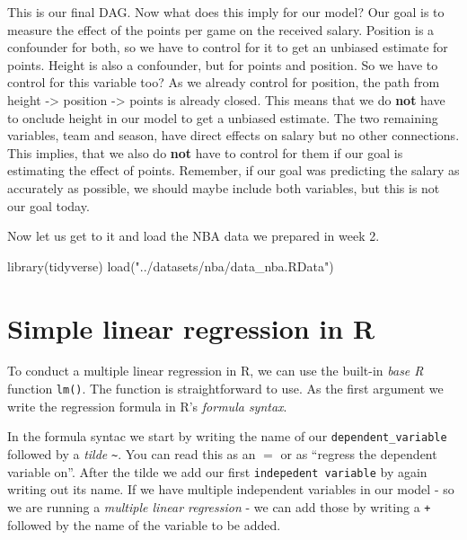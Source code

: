 \documentclass[
]{book}
\newenvironment{Shaded}{\begin{snugshade}}{\end{snugshade}}
\newcommand{\FunctionTok}[1]{\textcolor[rgb]{0.00,0.00,0.00}{#1}}
\newcommand{\NormalTok}[1]{#1}
\newcommand{\StringTok}[1]{\textcolor[rgb]{0.31,0.60,0.02}{#1}}
\begin{document}
This is our final DAG. Now what does this imply for our model?
Our goal is to measure the effect of the points per game on the received
salary. Position is a confounder for both, so we have to control for it to get
an unbiased estimate for points. Height is also a confounder, but for points
and position. So we have to control for this variable too? As we already control
for position, the path from height -\textgreater{} position -\textgreater{} points is already closed. This
means that we do \textbf{not} have to onclude height in our model to get a unbiased
estimate. The two remaining variables, team and season, have direct effects on
salary but no other connections. This implies, that we also do \textbf{not} have to
control for them if our goal is estimating the effect of points. Remember, if
our goal was predicting the salary as accurately as possible, we should maybe
include both variables, but this is not our goal today.

Now let us get to it and load the NBA data we prepared in week 2.

\begin{Shaded}
\begin{Highlighting}[]
\FunctionTok{library}\NormalTok{(tidyverse)}
\FunctionTok{load}\NormalTok{(}\StringTok{"../datasets/nba/data\_nba.RData"}\NormalTok{)}
\end{Highlighting}
\end{Shaded}

\hypertarget{simple-linear-regression-in-r}{%
\section{Simple linear regression in R}\label{simple-linear-regression-in-r}}

To conduct a multiple linear regression in R, we can use the built-in \emph{base R}
function \texttt{lm()}. The function is straightforward to use. As the first argument
we write the regression formula in R's \emph{formula syntax}.

In the formula syntac we start by writing the name of our \texttt{dependent\_variable}
followed by a \emph{tilde} \texttt{\textasciitilde{}}. You can read this as an \(=\) or as ``regress the
dependent variable on''. After the tilde we add our first \texttt{indepedent\ variable}
by again writing out its name. If we have multiple independent variables in our
model - so we are running a \emph{multiple linear regression} - we can add those by
writing a \texttt{+} followed by the name of the variable to be added.
\end{document}

